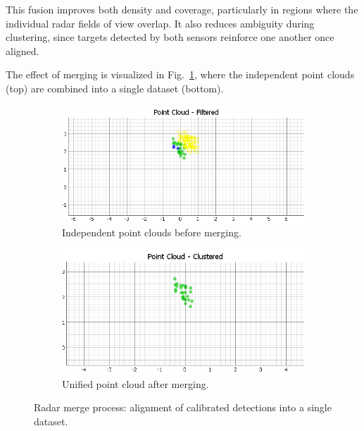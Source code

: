 This fusion improves both density and coverage, particularly in regions where the individual radar fields of view overlap.  
It also reduces ambiguity during clustering, since targets detected by both sensors reinforce one another once aligned.  

The effect of merging is visualized in Fig.~\ref{fig:radar_merge}, where the independent point clouds (top) are combined into a single dataset (bottom).  

\begin{figure}[!htbp]
    \centering
    \begin{subfigure}[t]{0.8\linewidth}
        \centering
        \includegraphics[width=\linewidth]{images/AFTERdualSensorCalib_2mts.png}
        \caption{Independent point clouds before merging.}
    \end{subfigure}
    \vfill
    \begin{subfigure}[t]{0.8\linewidth}
        \centering
        \includegraphics[width=\linewidth]{images/AFTERdualSensorCalibCluster_2mts.png}
        \caption{Unified point cloud after merging.}
    \end{subfigure}
    \caption{Radar merge process: alignment of calibrated detections into a single dataset.}
    \label{fig:radar_merge}
\end{figure}
